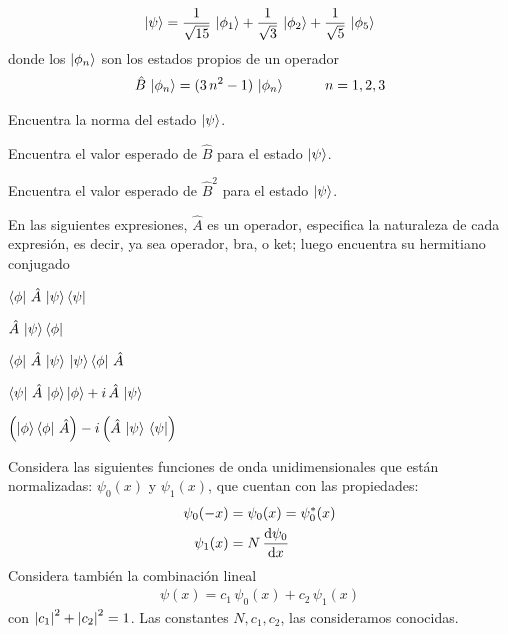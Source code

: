 \begin{milista}
\begin{align*}
\ket{\psi} = \dfrac{1}{\sqrt{15}} \, \ket{\phi_{1}} + \dfrac{1}{\sqrt{3}} \, \ket{\phi_{2}} + \dfrac{1}{\sqrt{5}} \, \ket{\phi_{5}}
\end{align*}
donde los $\ket{\phi_{n}}$ son los estados propios de un operador 
\begin{align*}
\hat{B} \, \ket{\phi_{n}} = (3 \, n^{2} - 1) \, \ket{\phi_{n}} \hspace{1cm} n = 1, 2, 3
\end{align*}
\begin{milista}
\item Encuentra la norma del estado $\ket{\psi}$.
\item Encuentra el valor esperado de $\hat{B}$ para el estado $\ket{\psi}$.
\item Encuentra el valor esperado de $\hat{B}^{2}$ para el estado $\ket{\psi}$.
\end{milista}
\item En las siguientes expresiones, $\hat{A}$ es un operador, especifica la naturaleza de cada expresión, es decir, ya sea operador, bra, o ket; luego encuentra su hermitiano conjugado
\begin{milista}
\item $\bra{\phi} \, \hat{A} \, \ket{\psi} \bra{\psi}$
\item $\hat{A} \, \ket{\psi} \bra{\phi}$
\item $\bra{\phi} \, \hat{A} \, \ket{\psi} \, \ket{\psi} \bra{\phi} \, \hat{A}$
\item $\bra{\psi} \, \hat{A} \, \ket{\phi} \ket{\phi} + i \, \hat{A} \, \ket{\psi}$
\item $\left( \ket{\phi} \bra{\phi} \, \hat{A} \right) - i \left( \hat{A} \, \ket{\psi} \, \bra{\psi} \right)$
\end{milista}
\item Considera las siguientes funciones de onda unidimensionales que están normalizadas: $\psi_{0}(x)$ y $\psi_{1}(x)$, que cuentan con las propiedades:
\begin{align*}
\psi_{0}(-x) &= \psi_{0}(x) = \psi_{0}^{*} (x) \\
\psi_{1}(x) &= N \, \dv{\psi_{0}}{x}
\end{align*}
Considera también la combinación lineal
\begin{align*}
\psi(x) = c_{1} \, \psi_{0}(x) + c_{2} \, \psi_{1} (x)
\end{align*}
con $\abs{c_{1}}^{2} + \abs{c_{2}}^{2} = 1$. Las constantes $N, c_{1}, c_{2}$, las consideramos conocidas.

\end{milista}
